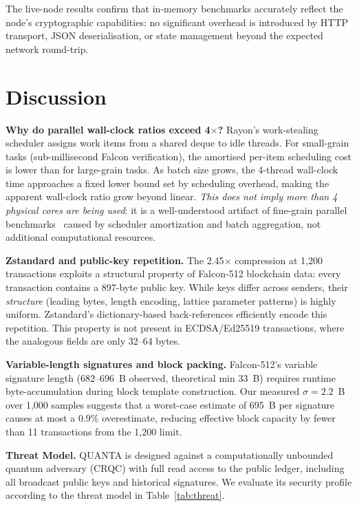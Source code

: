 \documentclass[11pt,a4paper]{article}
\begin{document}
The live-node results confirm that in-memory benchmarks accurately reflect the
node's cryptographic capabilities: no significant overhead is introduced by
HTTP transport, JSON deserialisation, or state management beyond the expected
network round-trip.

\section{Discussion}
\label{sec:discussion}
\textbf{Why do parallel wall-clock ratios exceed 4$\times$?}
Rayon's work-stealing scheduler assigns work items from a shared deque to
idle threads. For small-grain tasks (sub-millisecond Falcon verification),
the amortised per-item scheduling cost is lower than for large-grain tasks.
As batch size grows, the 4-thread wall-clock time approaches a fixed lower
bound set by scheduling overhead, making the apparent wall-clock ratio grow
beyond linear. \emph{This does not imply more than 4 physical cores are
being used}: it is a well-understood artifact of fine-grain parallel
benchmarks~\cite{paquin2020} caused by scheduler amortization and batch
aggregation, not additional computational resources.

\textbf{Zstandard and public-key repetition.}
The 2.45$\times$ compression at 1,200 transactions exploits a structural
property of Falcon-512 blockchain data: every transaction contains a 897-byte
public key. While keys differ across senders, their \emph{structure} (leading
bytes, length encoding, lattice parameter patterns) is highly uniform.
Zstandard's dictionary-based back-references efficiently encode this
repetition. This property is not present in ECDSA/Ed25519 transactions,
where the analogous fields are only 32--64 bytes.

\textbf{Variable-length signatures and block packing.}
Falcon-512's variable signature length (682--696~B observed, theoretical
min 33~B) requires runtime byte-accumulation during block template
construction. Our measured $\sigma = 2.2$~B over 1,000 samples suggests that
a worst-case estimate of 695~B per signature causes at most a 0.9\%
overestimate, reducing effective block capacity by fewer than 11 transactions
from the 1,200 limit.

\textbf{Threat Model.}
QUANTA is designed against a computationally unbounded quantum adversary (CRQC)
with full read access to the public ledger, including all broadcast public keys
and historical signatures. We evaluate its security profile according to the threat model in Table~\ref{tab:threat}.
\end{document}
